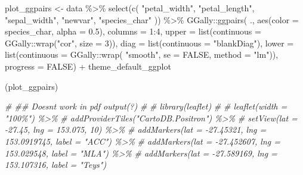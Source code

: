 \documentclass[
]{article}
\newenvironment{Shaded}{\begin{snugshade}}{\end{snugshade}}
\newcommand{\AttributeTok}[1]{\textcolor[rgb]{0.77,0.63,0.00}{#1}}
\newcommand{\CommentTok}[1]{\textcolor[rgb]{0.56,0.35,0.01}{\textit{#1}}}
\newcommand{\ConstantTok}[1]{\textcolor[rgb]{0.00,0.00,0.00}{#1}}
\newcommand{\DecValTok}[1]{\textcolor[rgb]{0.00,0.00,0.81}{#1}}
\newcommand{\FloatTok}[1]{\textcolor[rgb]{0.00,0.00,0.81}{#1}}
\newcommand{\FunctionTok}[1]{\textcolor[rgb]{0.00,0.00,0.00}{#1}}
\newcommand{\NormalTok}[1]{#1}
\newcommand{\OtherTok}[1]{\textcolor[rgb]{0.56,0.35,0.01}{#1}}
\newcommand{\SpecialCharTok}[1]{\textcolor[rgb]{0.00,0.00,0.00}{#1}}
\newcommand{\StringTok}[1]{\textcolor[rgb]{0.31,0.60,0.02}{#1}}
\begin{document}
\begin{Shaded}
\begin{Highlighting}[]
\NormalTok{plot\_ggpairs }\OtherTok{\textless{}{-}} 
\NormalTok{  data }\SpecialCharTok{\%\textgreater{}\%}
    \FunctionTok{select}\NormalTok{(}\FunctionTok{c}\NormalTok{(}
      \StringTok{"petal\_width"}\NormalTok{,  }\StringTok{"petal\_length"}\NormalTok{, }\StringTok{"sepal\_width"}\NormalTok{, }\StringTok{"newvar"}\NormalTok{, }\StringTok{"species\_char"}
\NormalTok{    )) }\SpecialCharTok{\%\textgreater{}\%}
\NormalTok{    GGally}\SpecialCharTok{::}\FunctionTok{ggpairs}\NormalTok{( .,  }
             \FunctionTok{aes}\NormalTok{(}\AttributeTok{color =}\NormalTok{ species\_char, }\AttributeTok{alpha =} \FloatTok{0.5}\NormalTok{),}
             \AttributeTok{columns =} \DecValTok{1}\SpecialCharTok{:}\DecValTok{4}\NormalTok{,}
             \AttributeTok{upper =} \FunctionTok{list}\NormalTok{(}\AttributeTok{continuous =}\NormalTok{ GGally}\SpecialCharTok{::}\FunctionTok{wrap}\NormalTok{(}\StringTok{"cor"}\NormalTok{, }\AttributeTok{size =} \DecValTok{3}\NormalTok{)),}
             \AttributeTok{diag =}  \FunctionTok{list}\NormalTok{(}\AttributeTok{continuous =} \StringTok{"blankDiag"}\NormalTok{),}
             \AttributeTok{lower =} \FunctionTok{list}\NormalTok{(}\AttributeTok{continuous =}\NormalTok{ GGally}\SpecialCharTok{::}\FunctionTok{wrap}\NormalTok{( }\StringTok{"smooth"}\NormalTok{, }
                                                     \AttributeTok{se =} \ConstantTok{FALSE}\NormalTok{, }
                                                     \AttributeTok{method =} \StringTok{"lm"}\NormalTok{)),}
             \AttributeTok{progress =} \ConstantTok{FALSE}\NormalTok{) }\SpecialCharTok{+}
\NormalTok{      theme\_default\_ggplot}


\NormalTok{(plot\_ggpairs)}


\CommentTok{\# \#\# Doesn\textquotesingle{}t work in pdf output(?)}
\CommentTok{\# }
\CommentTok{\# library(leaflet)}
\CommentTok{\# }
\CommentTok{\# leaflet(width = "100\%") \%\textgreater{}\%}
\CommentTok{\#   addProviderTiles("CartoDB.Positron") \%\textgreater{}\%}
\CommentTok{\#   setView(lat = {-}27.45, lng = 153.075, 10) \%\textgreater{}\%}
\CommentTok{\#   addMarkers(lat = {-}27.45321, lng = 153.0919745, label = "ACC") \%\textgreater{}\%}
\CommentTok{\#   addMarkers(lat = {-}27.452607, lng = 153.029548, label = "MLA") \%\textgreater{}\%}
\CommentTok{\#   addMarkers(lat = {-}27.589169, lng = 153.107316, label = "Teys")}




\end{Highlighting}
\end{Shaded}
\end{document}
